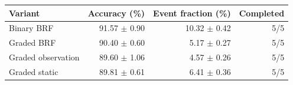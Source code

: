 \begin{tabular}{lrrr}
\toprule
Variant & Accuracy (\%) & Event fraction (\%) & Completed\\
\midrule
Binary BRF & 91.57 $\pm$ 0.90 & 10.32 $\pm$ 0.42 & 5/5 \\
Graded BRF & 90.40 $\pm$ 0.60 & 5.17 $\pm$ 0.27 & 5/5 \\
Graded observation & 89.60 $\pm$ 1.06 & 4.57 $\pm$ 0.26 & 5/5 \\
Graded static & 89.81 $\pm$ 0.61 & 6.41 $\pm$ 0.36 & 5/5 \\
\bottomrule
\end{tabular}
